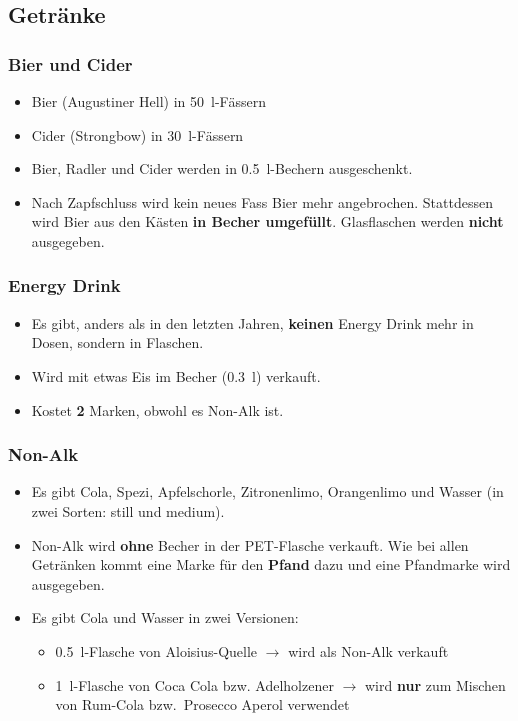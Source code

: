 \subsection{Getränke}
\subsubsection{Bier und Cider}
\begin{itemize}
    \item Bier (Augustiner Hell) in \SI{50}{\litre}-Fässern
    \item Cider (Strongbow) in \SI{30}{\litre}-Fässern
    \item Bier, Radler und Cider werden in \SI{0.5}{\litre}-Bechern ausgeschenkt.
    \item Nach Zapfschluss wird kein neues Fass Bier mehr angebrochen. Stattdessen wird Bier aus den Kästen \textbf{in Becher umgefüllt}. Glasflaschen werden \textbf{nicht} ausgegeben.
\end{itemize}
\subsubsection{Energy Drink}
\begin{itemize}
    \item Es gibt, anders als in den letzten Jahren, \textbf{keinen} Energy Drink mehr in Dosen, sondern in Flaschen.
    \item Wird mit etwas Eis im Becher (\SI{0.3}{\litre}) verkauft.
    \item Kostet \textbf{2} Marken, obwohl es Non-Alk ist.
\end{itemize}
\subsubsection{Non-Alk}
\begin{itemize}
    \item Es gibt Cola, Spezi, Apfelschorle, Zitronenlimo, Orangenlimo und Wasser (in zwei Sorten: still und medium).
    \item Non-Alk wird \textbf{ohne} Becher in der PET-Flasche verkauft. Wie bei allen Getränken kommt eine Marke für den \textbf{Pfand} dazu und eine Pfandmarke wird ausgegeben.
    \item Es gibt Cola und Wasser in zwei Versionen:
        \begin{itemize}
            \item \SI{0.5}{\litre}-Flasche von Aloisius-Quelle $\rightarrow$ wird als Non-Alk verkauft
            \item \SI{1}{\litre}-Flasche von Coca Cola bzw. Adelholzener $\rightarrow$ wird \textbf{nur} zum Mischen von Rum-Cola bzw.\ Prosecco Aperol verwendet
        \end{itemize}
\end{itemize}

